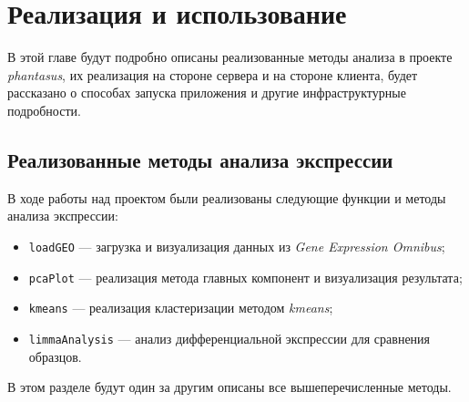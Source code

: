 \chapter{Реализация и использование}\label{implementation}
В этой главе будут подробно описаны реализованные методы анализа в проекте \emph{phantasus}, их реализация на стороне сервера и на стороне клиента, будет рассказано о способах запуска приложения и другие инфраструктурные подробности.
\section{Реализованные методы анализа экспрессии}
В ходе работы над проектом были реализованы следующие функции и методы анализа экспрессии:\begin{itemize}
\item \texttt{loadGEO} --- загрузка и визуализация данных из \emph{Gene Expression Omnibus};
\item \texttt{pcaPlot} --- реализация метода главных компонент и визуализация результата;
\item \texttt{kmeans} --- реализация кластеризации методом \emph{kmeans};
\item \texttt{limmaAnalysis} --- анализ дифференциальной экспрессии для сравнения образцов. \end{itemize}

В этом разделе будут один за другим описаны все вышеперечисленные методы.

